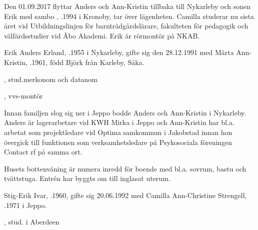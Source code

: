 %



%
Den 01.09.2017 flyttar Anders och Ann-Kristin tillbaka till Nykarleby och sonen Erik med sambo , .1994 i Kronoby, tar över lägenheten. Camilla studerar nu sista året vid Utbildningslinjen för barnträdgårdslärare, fakulteten för pedagogik och välfärdsstudier vid Åbo Akademi. Erik är rörmontör på NKAB.


%
Erik Anders Erland, .1955 i Nykarleby, gifte sig den 28.12.1991 med Märta Ann-Kristin, .1961, född Björk från Karleby, Såka.
\begin{jhchildren}
  \item {}, stud.merkonom och datanom
  \item {}, vvs-montör
\end{jhchildren}

Innan familjen slog sig ner i Jeppo bodde Anders och Ann-Kristin i Nykarleby. Anders är lagerarbetare vid KWH Mirka i Jeppo och Ann-Kristin har bl.a. arbetat som projektledare vid Optima samkommun i Jakobstad innan hon övergick till funktionen som verksamhetsledare på Psykosociala föreningen Contact rf på samma ort.

Husets bottenvåning är numera inredd för boende med bl.a. sovrum, bastu och tvättstuga. Entrén har byggts om till inglasat uterum.


%
Stig-Erik Ivar, .1960, gifte sig 20.06.1992 med Camilla Ann-Christine Strengell, .1971 i Jeppo.
\begin{jhchildren}
  \item {}, stud. i Aberdeen
  \item {}
  \item {}
  \item {}
\end{jhchildren}

